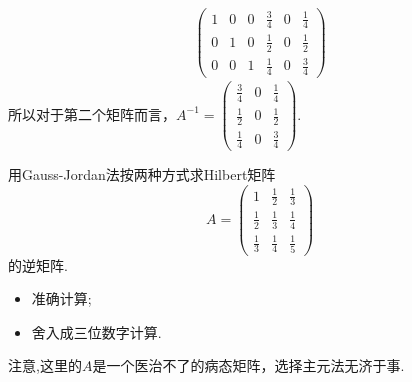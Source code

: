 ﻿\documentclass{book} \usepackage{exsheets} \usepackage{xeCJK}
\begin{document}
\begin{solution}
\begin{align*}
\begin{pmatrix}
                                                                                                      1&0&0&\frac{3}{4}&0&\frac{1}{4}\\
                                                                                                      0&1&0&\frac{1}{2}&0&\frac{1}{2}\\
                                                                                                      0&0&1&\frac{1}{4}&0&\frac{3}{4}
                                                                                                    \end{pmatrix}
  \end{align*}
  所以对于第二个矩阵而言，$A^{-1}=
  \begin{pmatrix}
    \frac{3}{4}&0&\frac{1}{4}\\
    \frac{1}{2}&0&\frac{1}{2}\\
    \frac{1}{4}&0&\frac{3}{4}
  \end{pmatrix}
  $.
\end{solution}
\begin{question}
  用Gauss-Jordan法按两种方式求Hilbert矩阵
$$
A=
\begin{pmatrix}
  1&\frac{1}{2}&\frac{1}{3}\\
  \frac{1}{2}&\frac{1}{3}&\frac{1}{4}\\
  \frac{1}{3}&\frac{1}{4}&\frac{1}{5}
\end{pmatrix}
$$
的逆矩阵.
\begin{itemize}
\item 准确计算;
\item 舍入成三位数字计算.
\end{itemize}
注意,这里的$A$是一个医治不了的病态矩阵，选择主元法无济于事.
\end{question}
\end{document}
